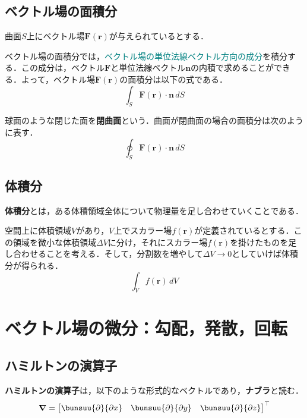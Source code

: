 \subsection{ベクトル場の面積分}

曲面$S$上にベクトル場$\bm{F}(\bm{r})$が与えられているとする．

ベクトル場の面積分では，\textcolor{teal}{ベクトル場の単位法線ベクトル方向の成分}を積分する．この成分は，ベクトル$\bm{F}$と単位法線ベクトル$\bm{n}$の内積で求めることができる．よって，ベクトル場$\bm{F}(\bm{r})$の面積分は以下の式である．
\begin{equation}
	\int_{S} \bm{F}(\bm{r}) \cdot \bm{n} \, dS
\end{equation}

球面のような閉じた面を\textbf{閉曲面}という．曲面が閉曲面の場合の面積分は次のように表す．
\begin{equation}
	\oint_{S} \bm{F}(\bm{r}) \cdot \bm{n}\,dS
\end{equation}



\subsection{体積分}

\textbf{体積分}とは，ある体積領域全体について物理量を足し合わせていくことである．

空間上に体積領域$V$があり，$V$上でスカラー場$f(\bm{r})$が定義されているとする．この領域を微小な体積領域$\varDelta V$に分け，それにスカラー場$f(\bm{r})$を掛けたものを足し合わせることを考える．そして，分割数を増やして$\varDelta V \to 0$としていけば体積分が得られる．
\begin{equation}
	\int_{V} f(\bm{r})\,dV
\end{equation}



\section{ベクトル場の微分：勾配，発散，回転}

\subsection{ハミルトンの演算子}

\textbf{ハミルトンの演算子}は，以下のような形式的なベクトルであり，\textbf{ナブラ}と読む．
\begin{equation}
	\bm{\nabla} =
	\begin{bmatrix}
		\bunsuu{\partial}{\partial x} &
		\bunsuu{\partial}{\partial y} &
		\bunsuu{\partial}{\partial z}
	\end{bmatrix}^\top
\end{equation}

